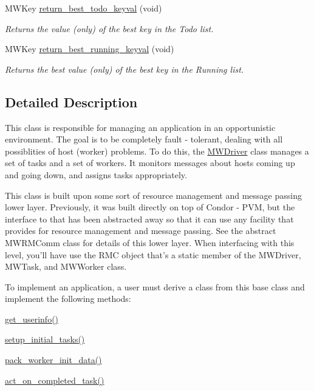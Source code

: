 \begin{DoxyCompactItemize}
M\+W\+Key \hyperlink{classMWDriver_add3bc92ab03d051502e69ca03de4928f}{return\+\_\+best\+\_\+todo\+\_\+keyval} (void)
\begin{DoxyCompactList}\small\item\em Returns the value (only) of the best key in the Todo list. \end{DoxyCompactList}\item 
\mbox{\label{classMWDriver_a0579cc034d3c83ea68ab456d222b8b79}} 
M\+W\+Key \hyperlink{classMWDriver_a0579cc034d3c83ea68ab456d222b8b79}{return\+\_\+best\+\_\+running\+\_\+keyval} (void)
\begin{DoxyCompactList}\small\item\em Returns the best value (only) of the best key in the Running list. \end{DoxyCompactList}\end{DoxyCompactItemize}


\subsection{Detailed Description}
This class is responsible for managing an application in an opportunistic environment. The goal is to be completely fault -\/ tolerant, dealing with all possiblities of host (worker) problems. To do this, the \hyperlink{classMWDriver}{M\+W\+Driver} class manages a set of tasks and a set of workers. It monitors messages about hosts coming up and going down, and assigns tasks appropriately. \begin{DoxyVerb}This class is built upon some sort of resource management and 
message passing lower layer.  Previously, it was built directly 
on top of Condor - PVM, but the interface to that has been 
abstracted away so that it can use any facility that provides 
for resource management and message passing.  See the abstract
MWRMComm class for details of this lower layer.  When interfacing
with this level, you'll have use the RMC object that's a static
member of the MWDriver, MWTask, and MWWorker class.  
\end{DoxyVerb}


To implement an application, a user must derive a class from this base class and implement the following methods\+:


\begin{DoxyItemize}
\item \hyperlink{classMWDriver_acf0edc86b06b46968114c8bb770791b2}{get\+\_\+userinfo()}
\item \hyperlink{classMWDriver_a618bdbf6e481a903455e068ba37ba0fa}{setup\+\_\+initial\+\_\+tasks()}
\item \hyperlink{classMWDriver_a6a142fda8b58806b1769558afd17c85c}{pack\+\_\+worker\+\_\+init\+\_\+data()}
\item \hyperlink{classMWDriver_a920118e3f49ab81db5047d9ecdbcea2b}{act\+\_\+on\+\_\+completed\+\_\+task()}
\end{DoxyItemize}

